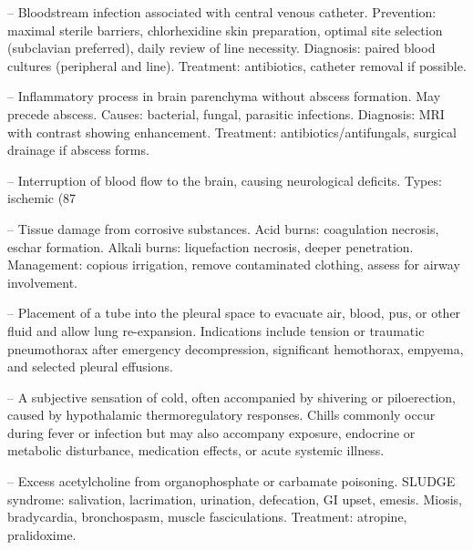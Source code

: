 -- Bloodstream infection associated with central venous catheter. Prevention: maximal sterile barriers, chlorhexidine skin preparation, optimal site selection (subclavian preferred), daily review of line necessity. Diagnosis: paired blood cultures (peripheral and line). Treatment: antibiotics, catheter removal if possible.

-- Inflammatory process in brain parenchyma without abscess formation. May precede abscess. Causes: bacterial, fungal, parasitic infections. Diagnosis: MRI with contrast showing enhancement. Treatment: antibiotics/antifungals, surgical drainage if abscess forms.

-- Interruption of blood flow to the brain, causing neurological deficits. Types: ischemic (87%

-- Tissue damage from corrosive substances. Acid burns: coagulation necrosis, eschar formation. Alkali burns: liquefaction necrosis, deeper penetration. Management: copious irrigation, remove contaminated clothing, assess for airway involvement.

-- Placement of a tube into the pleural space to evacuate air, blood, pus, or other fluid and allow lung re-expansion. Indications include tension or traumatic pneumothorax after emergency decompression, significant hemothorax, empyema, and selected pleural effusions.

-- A subjective sensation of cold, often accompanied by shivering or piloerection, caused by hypothalamic thermoregulatory responses. Chills commonly occur during fever or infection but may also accompany exposure, endocrine or metabolic disturbance, medication effects, or acute systemic illness.

-- Excess acetylcholine from organophosphate or carbamate poisoning. SLUDGE syndrome: salivation, lacrimation, urination, defecation, GI upset, emesis. Miosis, bradycardia, bronchospasm, muscle fasciculations. Treatment: atropine, pralidoxime.

